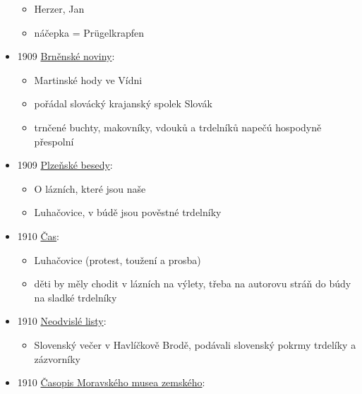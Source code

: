 \begin{itemize}
  \begin{itemize}
  \tightlist
  \item
    Herzer, Jan
  \item
    náčepka = Prügelkrapfen
  \end{itemize}
\item
  1909
  \href{https://ceskadigitalniknihovna.cz/uuid/uuid:c455e0f0-cd7f-11e3-b110-005056827e51}{Brněnské
  noviny}:

  \begin{itemize}
  \tightlist
  \item
    Martinské hody ve Vídni
  \item
    pořádal slovácký krajanský spolek Slovák
  \item
    trnčené buchty, makovníky, vdouků a trdelníků napečú hospodyně
    přespolní
  \end{itemize}
\item
  1909
  \href{https://ceskadigitalniknihovna.cz/uuid/uuid:649fe960-411f-47df-9f66-f407e20f9b16}{Plzeňské
  besedy}:

  \begin{itemize}
  \tightlist
  \item
    O lázních, které jsou naše
  \item
    Luhačovice, v búdě jsou pověstné trdelníky
  \end{itemize}
\item
  1910
  \href{https://ceskadigitalniknihovna.cz/view/uuid:b06a8860-7d9d-11e9-85ec-005056825209?page=uuid\%3Ab3e88f80-7e35-11e9-b171-5ef3fc9ae867&fulltext=trdeln\%C3\%ADk\%20OR\%20trdeln\%C3\%ADky\%20OR\%20trdeln\%C3\%ADk\%C5\%AF&source=nkp}{Čas}:

  \begin{itemize}
  \tightlist
  \item
    Luhačovice (protest, toužení a prosba)
  \item
    děti by měly chodit v lázních na výlety, třeba na autorovu stráň do
    búdy na sladké trdelníky
  \end{itemize}
\item
  1910
  \href{https://ceskadigitalniknihovna.cz/view/uuid:9619abc6-e10c-479a-a5c6-82a48f7789f4?page=uuid\%3Adefe860e-1878-4938-89bc-3a04bc29b94b&source=kkp}{Neodvislé
  listy}:

  \begin{itemize}
  \tightlist
  \item
    Slovenský večer v Havlíčkově Brodě, podávali slovenský pokrmy
    trdelíky a zázvorníky
  \end{itemize}
\item
  1910
  \href{https://ceskadigitalniknihovna.cz/uuid/uuid:f19aaf80-126a-11e8-8cd8-5ef3fc9bb22f}{Časopis
  Moravského musea zemského}:


\end{itemize}
